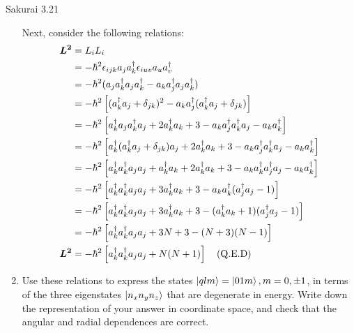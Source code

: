 \documentclass{article}
\newcommand{\bs}{\boldsymbol}
\begin{document}
\begin{section}{Sakurai 3.21}
\begin{enumerate}
\begin{tcolorbox}[breakable]
		Next, consider the following relations:
		\begin{align*}
			\bs{L^2} & = L_i L_i                                                                                                                                                \\
			         & = -\hbar^2 \epsilon_{ijk} a_j a_k^\dagger \epsilon_{iuv} a_u a_v^\dagger                                                                                 \\
			         & = -\hbar^2 (a_j a_k^\dagger a_j a_k^\dagger - a_k a_j^\dagger a_j a_k^\dagger)                                                                           \\
			         & = -\hbar^2 \left[ (a_k^\dagger a_j + \delta_{jk})^2 - a_k a_j^\dagger (a_k^\dagger a_j + \delta_{jk}) \right]                                            \\
			         & = -\hbar^2 \left[ a_k^\dagger a_j a_k^\dagger a_j + 2 a_k^\dagger a_k + 3 - a_k a_j^\dagger a_k^\dagger a_j - a_k a_k^\dagger  \right]                   \\
			         & = -\hbar^2 \left[ a_k^\dagger (a_k^\dagger a_j + \delta_{jk}) a_j + 2 a_k^\dagger a_k + 3 - a_k a_j^\dagger a_k^\dagger a_j - a_k a_k^\dagger  \right]   \\
			         & = -\hbar^2 \left[ a_k^\dagger a_k^\dagger a_j a_j + a_k^\dagger a_k + 2 a_k^\dagger a_k + 3 - a_k a_k^\dagger a_j^\dagger a_j - a_k a_k^\dagger  \right] \\
			         & = -\hbar^2 \left[ a_k^\dagger a_k^\dagger a_j a_j + 3 a_k^\dagger a_k + 3 - a_k a_k^\dagger (a_j^\dagger a_j - 1)  \right]                               \\
			         & = -\hbar^2 \left[ a_k^\dagger a_k^\dagger a_j a_j + 3 a_k^\dagger a_k + 3 - (a_k^\dagger a_k + 1) (a_j^\dagger a_j - 1)  \right]                         \\
			         & = -\hbar^2 \left[ a_k^\dagger a_k^\dagger a_j a_j + 3N + 3 - (N + 3) (N - 1)  \right]                                                                    \\
			\bs{L^2} & = -\hbar^2 \left[ a_k^\dagger a_k^\dagger a_j a_j + N(N+1) \right] \qed
		\end{align*}
	\end{tcolorbox}

	\item Use these relations to express the states $\ket{qlm} = \ket{01m}, m = 0, \pm 1$, in terms of the three eigenstates $\ket{n_x n_y n_z}$ that are degenerate in energy. Write down the representation of your answer in coordinate space, and check that the angular and radial dependences are correct.


\end{enumerate}
\end{section}
\end{document}
